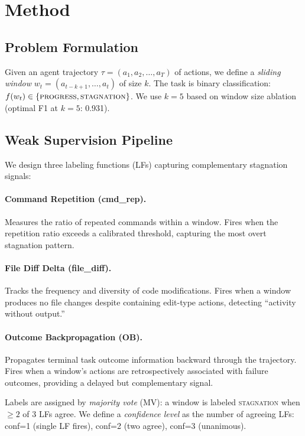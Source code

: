 \documentclass[11pt,a4paper]{article}
\begin{document}
\section{Method}

\subsection{Problem Formulation}

Given an agent trajectory $\tau = (a_1, a_2, \ldots, a_T)$ of actions, we define a \emph{sliding window} $w_t = (a_{t-k+1}, \ldots, a_t)$ of size $k$.
The task is binary classification: $f(w_t) \in \{\textsc{progress}, \textsc{stagnation}\}$.
We use $k=5$ based on window size ablation (optimal F1 at $k=5$: 0.931).

\subsection{Weak Supervision Pipeline}

We design three labeling functions (LFs) capturing complementary stagnation signals:

\paragraph{Command Repetition (cmd\_rep).}
Measures the ratio of repeated commands within a window.
Fires when the repetition ratio exceeds a calibrated threshold, capturing the most overt stagnation pattern.

\paragraph{File Diff Delta (file\_diff).}
Tracks the frequency and diversity of code modifications.
Fires when a window produces no file changes despite containing edit-type actions, detecting ``activity without output.''

\paragraph{Outcome Backpropagation (OB).}
Propagates terminal task outcome information backward through the trajectory.
Fires when a window's actions are retrospectively associated with failure outcomes, providing a delayed but complementary signal.

Labels are assigned by \emph{majority vote} (MV): a window is labeled \textsc{stagnation} when $\geq 2$ of 3 LFs agree.
We define a \emph{confidence level} as the number of agreeing LFs: conf=1 (single LF fires), conf=2 (two agree), conf=3 (unanimous).
\end{document}
